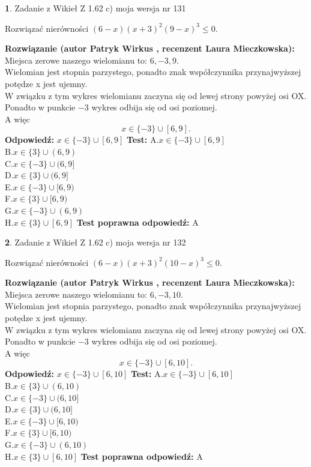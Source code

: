 \documentclass[12pt, a4paper]{article}
\theoremstyle{definition} %
\newtheorem{zad}{}
\newcommand{\zadStart}[1]{\begin{zad}#1\newline}
\newcommand{\zadStop}{\end{zad}}
\newcommand{\rozwStart}[2]{\noindent \textbf{Rozwiązanie (autor #1 , recenzent #2): }\newline}
\newcommand{\rozwStop}{\newline}
\newcommand{\odpStart}{\noindent \textbf{Odpowiedź:}\newline}
\newcommand{\odpStop}{\newline}
\newcommand{\testStart}{\noindent \textbf{Test:}\newline}
\newcommand{\testStop}{\newline}
\newcommand{\kluczStart}{\noindent \textbf{Test poprawna odpowiedź:}\newline}
\newcommand{\kluczStop}{\newline}
\begin{document}
\zadStart{Zadanie z Wikieł Z 1.62 c) moja wersja nr 131}

Rozwiązać nierówności $(6-x)(x+3)^{2}(9-x)^{3}\le0$.
\zadStop
\rozwStart{Patryk Wirkus}{Laura Mieczkowska}
Miejsca zerowe naszego wielomianu to: $6, -3, 9$.\\
Wielomian jest stopnia parzystego, ponadto znak współczynnika przy\linebreak najwyższej potędze x jest ujemny.\\ W związku z tym wykres wielomianu zaczyna się od lewej strony powyżej osi OX.\\
Ponadto w punkcie $-3$ wykres odbija się od osi poziomej.\\
A więc $$x \in \{-3\} \cup [6,9].$$
\rozwStop
\odpStart
$x \in \{-3\} \cup [6,9]$
\odpStop
\testStart
A.$x \in \{-3\} \cup [6,9]$\\
B.$x \in \{3\} \cup (6,9)$\\
C.$x \in \{-3\} \cup (6,9]$\\
D.$x \in \{3\} \cup (6,9]$\\
E.$x \in \{-3\} \cup [6,9)$\\
F.$x \in \{3\} \cup [6,9)$\\
G.$x \in \{-3\} \cup (6,9)$\\
H.$x \in \{3\} \cup [6,9]$
\testStop
\kluczStart
A
\kluczStop



\zadStart{Zadanie z Wikieł Z 1.62 c) moja wersja nr 132}

Rozwiązać nierówności $(6-x)(x+3)^{2}(10-x)^{3}\le0$.
\zadStop
\rozwStart{Patryk Wirkus}{Laura Mieczkowska}
Miejsca zerowe naszego wielomianu to: $6, -3, 10$.\\
Wielomian jest stopnia parzystego, ponadto znak współczynnika przy\linebreak najwyższej potędze x jest ujemny.\\ W związku z tym wykres wielomianu zaczyna się od lewej strony powyżej osi OX.\\
Ponadto w punkcie $-3$ wykres odbija się od osi poziomej.\\
A więc $$x \in \{-3\} \cup [6,10].$$
\rozwStop
\odpStart
$x \in \{-3\} \cup [6,10]$
\odpStop
\testStart
A.$x \in \{-3\} \cup [6,10]$\\
B.$x \in \{3\} \cup (6,10)$\\
C.$x \in \{-3\} \cup (6,10]$\\
D.$x \in \{3\} \cup (6,10]$\\
E.$x \in \{-3\} \cup [6,10)$\\
F.$x \in \{3\} \cup [6,10)$\\
G.$x \in \{-3\} \cup (6,10)$\\
H.$x \in \{3\} \cup [6,10]$
\testStop
\kluczStart
A
\kluczStop
\end{document}
